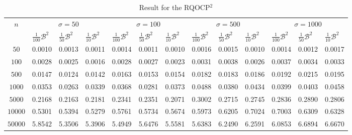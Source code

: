\documentclass{article}
\theoremstyle{plain}
\begin{document}
\begin{table}[H]
\small
\centering
\caption{Result for the RQOCP$^2$}
\label{tab2}
\begin{tabular}{|c|lll|lll|lll|lll|}
\hline
\multirow{2}{*}{$n$}  
 & \multicolumn{3}{c|}{$\sigma=50$} & \multicolumn{3}{c|}{$\sigma=100$} & \multicolumn{3}{c|}{$\sigma=500$} &\multicolumn{3}{c|}{$\sigma=1000$}\\
\cline{2-13}
 & $\frac{1}{100}\mathcal{B}^2$ & $\frac{1}{50} \mathcal{B}^2$ & $\frac{1}{10}\mathcal{B}^2$ & $\frac{1}{100}\mathcal{B}^2$ & $\frac{1}{50} \mathcal{B}^2$ & $\frac{1}{10}\mathcal{B}^2$ & $\frac{1}{100}\mathcal{B}^2$ & $\frac{1}{50} \mathcal{B}^2$ & $\frac{1}{10}\mathcal{B}^2$ & $\frac{1}{100}\mathcal{B}^2$ & $\frac{1}{50} \mathcal{B}^2$ & $\frac{1}{10}\mathcal{B}^2$\\
\hline
$50$ & 0.0010 & 0.0013  & 0.0011 & 0.0014 & 0.0011 &0.0010 & 0.0016 & 0.0015  &0.0010 & 0.0014 & 0.0012  &0.0017  \\
\hline
$100$ & 0.0028 & 0.0025  & 0.0016 & 0.0028 & 0.0027 & 0.0023 & 0.0031 & 0.0038& 0.0026& 0.0037 & 0.0034  & 0.0033 \\
\hline
$500$ & 0.0147 &  0.0124 & 0.0142 & 0.0163 & 0.0153 & 0.0154& 0.0182 &  0.0183 &0.0186 & 0.0192 & 0.0215  & 0.0195 \\
\hline
$1000$ & 0.0353 & 0.0263  & 0.0339 & 0.0368 & 0.0281 &0.0373 & 0.0488 & 0.0380  &0.0434 & 0.0399 & 0.0403  &0.0458  \\
\hline
$5000$ & 0.2168 & 0.2163  & 0.2181 & 0.2341 & 0.2351 &0.2071 & 0.3002 & 0.2715  &0.2745 & 0.2836 & 0.2890  & 0.2806 \\
\hline
$10000$ &0.5301  & 0.5394  & 0.5279 & 0.5761 & 0.5734 &0.5674 & 0.5973 & 0.6205  & 0.7024& 0.7003 & 0.6309  &0.6328  \\
\hline
$50000$ & 5.8542 & 5.3506  & 5.3906 & 5.4949 & 5.6476 &5.5581 & 5.6383 & 6.2490  & 6.2591 & 6.0853 &  6.6894 &6.6670  \\
\hline
\end{tabular}
\end{table}
\end{document}
